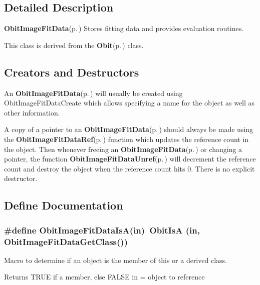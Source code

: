 \subsection{Detailed Description}
{\bf Obit\-Image\-Fit\-Data}{\rm (p.\,\pageref{structObitImageFitData})} Stores fitting data and provides evaluation routines. 

This class is derived from the {\bf Obit}{\rm (p.\,\pageref{structObit})} class.\subsection{Creators and Destructors}\label{ObitImageFitData_8h_ObitImageFitDataaccess}
An {\bf Obit\-Image\-Fit\-Data}{\rm (p.\,\pageref{structObitImageFitData})} will usually be created using Obit\-Image\-Fit\-Data\-Create which allows specifying a name for the object as well as other information.

A copy of a pointer to an {\bf Obit\-Image\-Fit\-Data}{\rm (p.\,\pageref{structObitImageFitData})} should always be made using the {\bf Obit\-Image\-Fit\-Data\-Ref}{\rm (p.\,\pageref{ObitImageFitData_8h_a1})} function which updates the reference count in the object. Then whenever freeing an {\bf Obit\-Image\-Fit\-Data}{\rm (p.\,\pageref{structObitImageFitData})} or changing a pointer, the function {\bf Obit\-Image\-Fit\-Data\-Unref}{\rm (p.\,\pageref{ObitImageFitData_8h_a0})} will decrement the reference count and destroy the object when the reference count hits 0. There is no explicit destructor.

\subsection{Define Documentation}
\subsubsection{\setlength{\rightskip}{0pt plus 5cm}\#define Obit\-Image\-Fit\-Data\-Is\-A(in)\ Obit\-Is\-A (in, Obit\-Image\-Fit\-Data\-Get\-Class())}\label{ObitImageFitData_8h_a2}


Macro to determine if an object is the member of this or a derived class. 

Returns TRUE if a member, else FALSE in = object to reference 
